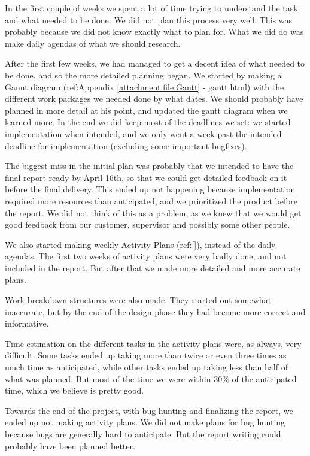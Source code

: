 In the first couple of weeks we spent a lot of time trying to understand the task and what needed to be done. We did not plan this process very well. This was probably because we did not know exactly what to plan for. What we did do was make daily agendas of what we should research.

After the first few weeks, we had managed to get a decent idea of what needed to be done, and so the more detailed planning began. We started by making a Gannt diagram (ref:Appendix \ref{attachment:file:Gantt} - gantt.html) with the different work packages we needed done by what dates. We should probably have planned in more detail at his point, and updated the gantt diagram when we learned more. In the end we did keep most of the deadlines we set: we started implementation when intended, and we only went a week past the intended deadline for implementation (excluding some important bugfixes). 

The biggest miss in the initial plan was probably that we intended to have the final report ready by April 16th, so that we could get detailed feedback on it before the final delivery. This ended up not happening because implementation required more resources than anticipated, and we prioritized the product before the report. We did not think of this as a problem, as we knew that we would get good feedback from our customer, supervisor and possibly some other people.

We also started making weekly Activity Plans (ref:\ref{}), instead of the daily agendas. The first two weeks of activity plans were very badly done, and not included in the report. But after that we made more detailed and more accurate plans.

Work breakdown structures were also made. They started out somewhat inaccurate, but by the end of the design phase they had become more correct and informative. 

Time estimation on the different tasks in the activity plans were, as always, very difficult. Some tasks ended up taking more than twice or even three times as much time as anticipated, while other tasks ended up taking less than half of what was planned. But most of the time we were within 30\% of the anticipated time, which we believe is pretty good.

Towards the end of the project, with bug hunting and finalizing the report, we ended up not making activity plans. We did not make plans for bug hunting because bugs are generally hard to anticipate. But the report writing could probably have been planned better.
